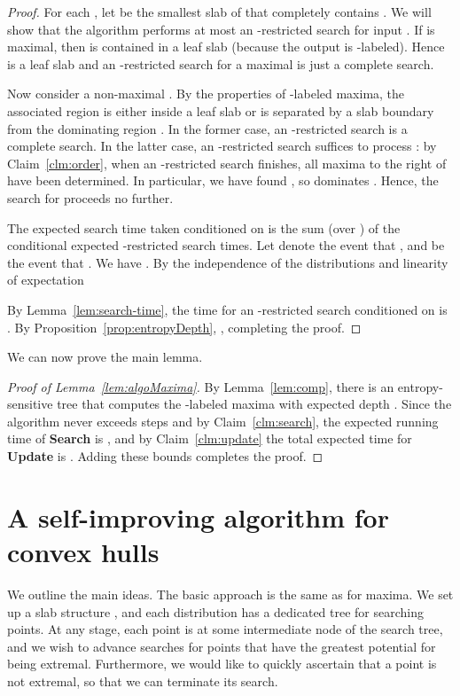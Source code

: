 \documentclass[letterpaper,11pt]{article}
\begin{document}
\begin{proof} 
For each , let  be the 
smallest slab of  that completely contains 
. We will show that the algorithm
performs at most an -restricted search 
for input . 
If  is maximal, then  is 
contained in a leaf slab (because 
the output is -labeled). Hence 
 is a leaf slab and an -restricted 
search for a maximal  is just 
a complete search.

Now consider a non-maximal . By the properties 
of -labeled maxima, the associated region  
is either inside a leaf slab or
is separated by a slab boundary from the dominating 
region .  In the former case, an -restricted 
search is a complete search.
In the latter case, an -restricted 
search suffices to process :  
by Claim~\ref{clm:order}, when an -restricted 
search finishes, all maxima to the right of 
 have been determined.  In particular, we have 
found , so  dominates .
Hence, the search for  proceeds no further.


The expected search time taken 
conditioned on  is 
the sum (over ) of the conditional 
expected -restricted search times. 
Let  denote the event that 
, and  be the event 
that .  We have 
.
By the independence of the distributions 
and linearity of expectation

By Lemma~\ref{lem:search-time}, the time 
for an -restricted search 
conditioned on  is 
. 
By Proposition~\ref{prop:entropyDepth}, 
,
completing the proof.
\end{proof}

We can now prove the main lemma.

\begin{proof}[Proof of Lemma~\ref{lem:algoMaxima}] 
By Lemma~\ref{lem:comp}, there is
an entropy-sensitive 
tree that computes the -labeled 
maxima with expected depth .
Since the algorithm never exceeds
 steps and by Claim~\ref{clm:search}, the 
expected running time of 
\textbf{Search} is , and 
by Claim~\ref{clm:update} the 
total expected time for \textbf{Update}
is . Adding these bounds completes 
the proof.
\end{proof}

\section{A self-improving algorithm for convex hulls}

We outline the main ideas. The basic approach
is the same as for maxima. We set up 
a slab structure , and each
distribution has a dedicated tree for searching 
points. At any stage, each point
is at some intermediate node of the search tree, 
and we wish to advance searches for points 
that have the greatest potential for being extremal.
Furthermore, we would like to quickly 
ascertain that a point is not extremal, so that
we can terminate its search.
\end{document}
